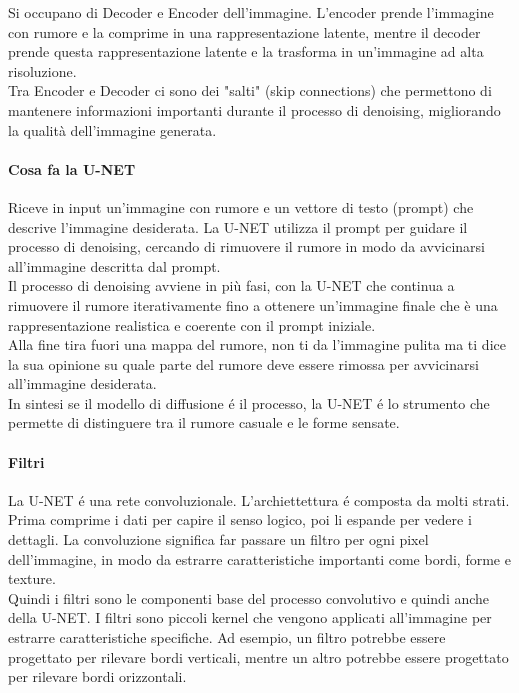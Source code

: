 Si occupano di Decoder e Encoder dell'immagine. L'encoder prende l'immagine con rumore e la comprime in una rappresentazione latente, mentre il decoder prende questa rappresentazione latente e la trasforma in un'immagine ad alta risoluzione.\\

Tra Encoder e Decoder ci sono dei "salti" (skip connections) che permettono di mantenere informazioni importanti durante il processo di denoising, migliorando la qualità dell'immagine generata.\\

\paragraph{Cosa fa la U-NET}
Riceve in input un'immagine con rumore e un vettore di testo (prompt) che descrive l'immagine desiderata. La U-NET utilizza il prompt per guidare il processo di denoising, cercando di rimuovere il rumore in modo da avvicinarsi all'immagine descritta dal prompt.\\
Il processo di denoising avviene in più fasi, con la U-NET che continua a rimuovere il rumore iterativamente fino a ottenere un'immagine finale che è una rappresentazione realistica e coerente con il prompt iniziale.\\
Alla fine tira fuori una mappa del rumore, non ti da l'immagine pulita ma ti dice la sua opinione su quale parte del rumore deve essere rimossa per avvicinarsi all'immagine desiderata.\\

In sintesi se il modello di diffusione é il processo, la U-NET é lo strumento che permette di distinguere tra il rumore casuale e le forme sensate.

\paragraph{Filtri}
La U-NET é una rete convoluzionale. L'archiettettura é composta da molti strati. Prima comprime i dati per capire il senso logico, poi li espande per vedere i dettagli. La convoluzione significa far passare un filtro per ogni pixel dell'immagine, in modo da estrarre caratteristiche importanti come bordi, forme e texture.\\

Quindi i filtri sono le componenti base del processo convolutivo e quindi anche della U-NET. I filtri sono piccoli kernel che vengono applicati all'immagine per estrarre caratteristiche specifiche. Ad esempio, un filtro potrebbe essere progettato per rilevare bordi verticali, mentre un altro potrebbe essere progettato per rilevare bordi orizzontali.\\

